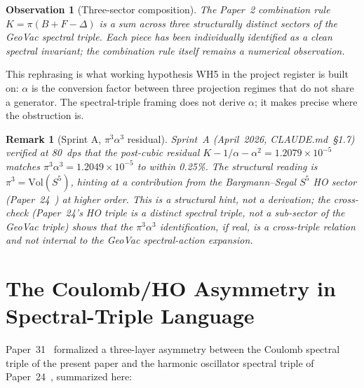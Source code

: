 \documentclass[11pt]{article}
\newtheorem{observation}{Observation}
\newtheorem{remark}{Remark}
\begin{document}
\begin{observation}[Three-sector composition]
\label{obs:three_sector}
The Paper~2 combination rule $K = \pi(B + F - \Delta)$ is a sum across
three structurally distinct sectors of the GeoVac spectral triple.
Each piece has been individually identified as a clean spectral
invariant; the combination rule itself remains a numerical observation.
\end{observation}

This rephrasing is what working hypothesis WH5 in the project register
is built on: $\alpha$ is the conversion factor between three projection
regimes that do not share a generator.  The spectral-triple framing
does not derive $\alpha$; it makes precise where the obstruction is.

\begin{remark}[Sprint A, $\pi^3 \alpha^3$ residual]
\label{rem:sprint_A}
Sprint~A (April~2026, CLAUDE.md~\S 1.7) verified at 80~dps that the
post-cubic residual $K - 1/\alpha - \alpha^2 = 1.2079 \times 10^{-5}$
matches $\pi^3 \alpha^3 = 1.2049 \times 10^{-5}$ to within 0.25\%.
The structural reading is $\pi^3 = \mathrm{Vol}(S^5)$, hinting at a
contribution from the Bargmann--Segal $S^5$ HO sector
(Paper~24~\cite{paper24}) at higher order.  This is a structural
hint, not a derivation; the cross-check (Paper~24's HO triple is a
distinct spectral triple, not a sub-sector of the GeoVac triple)
shows that the $\pi^3 \alpha^3$ identification, if real, is a
\emph{cross-triple} relation and not internal to the GeoVac
spectral-action expansion.
\end{remark}

\section{The Coulomb/HO Asymmetry in Spectral-Triple Language}
\label{sec:coulomb_ho}

Paper~31~\cite{paper31} formalized a three-layer asymmetry between the
Coulomb spectral triple of the present paper and the harmonic
oscillator spectral triple of Paper~24~\cite{paper24}, summarized
here:
\end{document}
